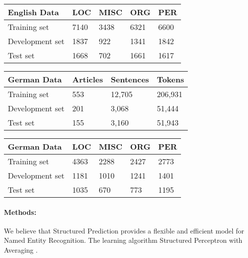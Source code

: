 \documentclass[a4paper,10pt]{article}
\begin{document}
\begin{table}[h!]
\centering
 \begin{tabular}{l|l|l|l|l}
 \textbf{English Data} & LOC      & MISC     & ORG &PER       \\ \hline
 Training set &   7140       &  3438  & 6321     & 6600    \\
 Development set&  1837       &  922         &  1341    &  1842    \\
 Test set       &  1668       &   702        &   1661    &  1617   \\
  
 \end{tabular}
\end{table}





\begin{table}[h!]
\centering
 \begin{tabular}{l|l|l|l}
 \textbf{German Data} & Articles & Sentences & Tokens \\ \hline
 Training set &     553     &  12,705         &  206,931      \\ 
 Development set&    201     &  3,068         &  51,444       \\
 Test set       &    155     &   3,160        &   51,943      \\
  
 \end{tabular}
\end{table}

\begin{table}[h!]
\centering
 \begin{tabular}{l|l|l|l|l}
 \textbf{German Data} & LOC      & MISC     & ORG &PER       \\        \hline
 Training set &   4363       &   2288        & 2427     & 2773    \\
 Development set&  1181       &   1010        &  1241    &  1401    \\
 Test set       &   1035      &    670       &  773     &  1195   \\
  
 \end{tabular}
\end{table}




\paragraph{Methods:}
We believe that Structured Prediction provides a flexible and efficient model for Named Entity Recognition. 
The learning algorithm Structured Perceptron with Averaging \cite{Collins:2002:DTM:1118693.1118694}.
\end{document}
